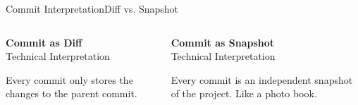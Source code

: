 \documentclass{setbeamer}
\begin{document}
\begin{frame}[c]{Commit Interpretation}{Diff vs. Snapshot}
    \begin{columns}[T]
        \begin{column}{0.5\textwidth}
            \textbf{Commit as Diff}\\Technical Interpretation

            \vspace{3mm}
            Every commit only stores the changes to the parent commit.
        \end{column}

        \begin{column}{0.5\textwidth}
            \textbf{Commit as Snapshot}\\Technical Interpretation

            \vspace{3mm}
            Every commit is an independent snapshot of the project. Like a photo book.
        \end{column}
    \end{columns}
\end{frame}
\end{document}
